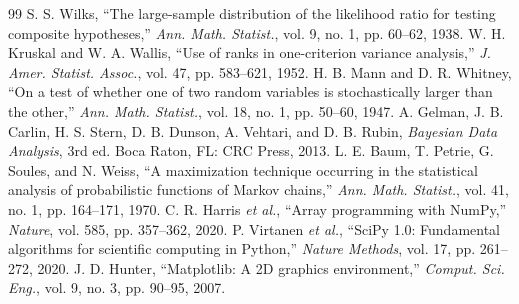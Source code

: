 \documentclass[conference]{IEEEtran}
\begin{document}
\begin{thebibliography}{99}
 S. S. Wilks, ``The large-sample distribution of the likelihood ratio for testing composite hypotheses,'' \emph{Ann. Math. Statist.}, vol. 9, no. 1, pp. 60--62, 1938.
 W. H. Kruskal and W. A. Wallis, ``Use of ranks in one-criterion variance analysis,'' \emph{J. Amer. Statist. Assoc.}, vol. 47, pp. 583--621, 1952.
 H. B. Mann and D. R. Whitney, ``On a test of whether one of two random variables is stochastically larger than the other,'' \emph{Ann. Math. Statist.}, vol. 18, no. 1, pp. 50--60, 1947.
 A. Gelman, J. B. Carlin, H. S. Stern, D. B. Dunson, A. Vehtari, and D. B. Rubin, \emph{Bayesian Data Analysis}, 3rd ed. Boca Raton, FL: CRC Press, 2013.
 L. E. Baum, T. Petrie, G. Soules, and N. Weiss, ``A maximization technique occurring in the statistical analysis of probabilistic functions of Markov chains,'' \emph{Ann. Math. Statist.}, vol. 41, no. 1, pp. 164--171, 1970.
 C. R. Harris \emph{et al.}, ``Array programming with NumPy,'' \emph{Nature}, vol. 585, pp. 357--362, 2020.
 P. Virtanen \emph{et al.}, ``SciPy 1.0: Fundamental algorithms for scientific computing in Python,'' \emph{Nature Methods}, vol. 17, pp. 261--272, 2020.
 J. D. Hunter, ``Matplotlib: A 2D graphics environment,'' \emph{Comput. Sci. Eng.}, vol. 9, no. 3, pp. 90--95, 2007.
\end{thebibliography}
\end{document}
